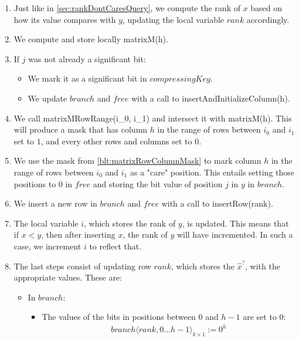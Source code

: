 \begin{enumerate}
\begin{enumerate}
        \item
        Just like in \ref{sec:rankDontCaresQuery}, we compute the rank of $x$ based on how its value compares with $y$, updating the local variable $rank$ accordingly.
        
        \item
        We compute and store locally {\ttfamily matrixM(h)}.
        
        \item
        If $j$ was not already a significant bit:
        \begin{itemize}
            \item
            We mark it as a significant bit in $compressingKey$.
            
            \item
            We update $branch$ and $free$ with a call to {\ttfamily insertAndInitializeColumn(h)}.
        \end{itemize}
        
        \item \label{blt:matrixRowColumnMask}
        We call {\ttfamily matrixMRowRange(i\_0, i\_1)} and intersect it with  {\ttfamily matrixM(h)}. This will produce a mask that has column $h$ in the range of rows between $i_0$ and $i_1$ set to $1$, and every other rows and columns set to $0$.
        
        \item
        We use the mask from \ref{blt:matrixRowColumnMask} to mark column $h$ in the range of rows between $i_0$ and $i_1$ as a "care" position. This entails setting those positions to $0$ in $free$ and storing the bit value of position $j$ in $y$ in $branch$.
        
        \item
        We insert a new row in $branch$ and $free$ with a call to {\ttfamily insertRow(rank)}.
        
        \item
        The local variable $i$, which stores the rank of $y$, is updated. This means that if $x < y$, then after inserting $x$, the rank of $y$ will have incremented. In such a case, we increment $i$ to reflect that.
        
        \item
        The last steps consist of updating row $rank$, which stores the $\hat x^?$, with the appropriate values. These are:
        \begin{itemize}
            \item
            In $branch$:
            \begin{itemize}
                \item
                The values of the bits in positions between $0$ and $h - 1$ are set to $0$:
                \begin{align*}
                    branch\langle rank, 0 \dots h - 1 \rangle_{k \times 1} := 0^h
                \end{align*}
                

\end{itemize}
\end{itemize}
\end{enumerate}
\end{enumerate}
